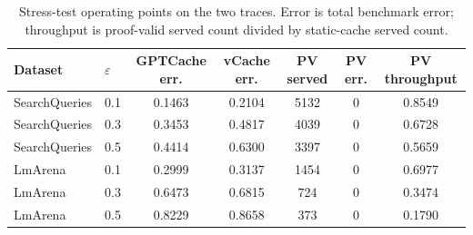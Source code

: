 \begin{table}[H]
\footnotesize
\caption{Stress-test operating points on the two traces.  Error is total
benchmark error; throughput is proof-valid served count divided by
static-cache served count.}
\label{tab:endpoints}
\tabcolsep 4pt
\begin{tabular*}{\textwidth}{@{\extracolsep{\fill}}llccccc@{}}
\toprule
Dataset & $\varepsilon$ & GPTCache err. & vCache err. & PV served & PV err. & PV throughput \\\hline
SearchQueries & 0.1 & 0.1463 & 0.2104 & 5132 & 0 & 0.8549 \\
SearchQueries & 0.3 & 0.3453 & 0.4817 & 4039 & 0 & 0.6728 \\
SearchQueries & 0.5 & 0.4414 & 0.6300 & 3397 & 0 & 0.5659 \\\hline
LmArena & 0.1 & 0.2999 & 0.3137 & 1454 & 0 & 0.6977 \\
LmArena & 0.3 & 0.6473 & 0.6815 & 724 & 0 & 0.3474 \\
LmArena & 0.5 & 0.8229 & 0.8658 & 373 & 0 & 0.1790 \\
\bottomrule
\end{tabular*}
\end{table}